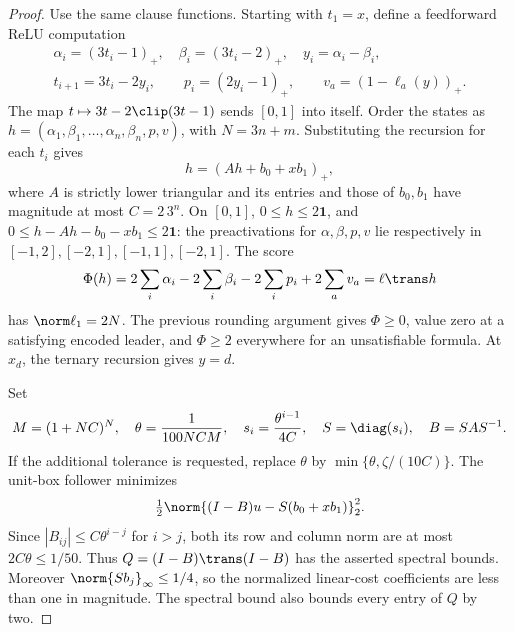 \begin{proof}
Use the same clause functions. Starting with \(t_1=x\), define a feedforward
ReLU computation
\[
 \begin{gathered}
 \alpha_i=(3t_i-1)_+,\quad \beta_i=(3t_i-2)_+,\quad y_i=\alpha_i-\beta_i,\\
 t_{i+1}=3t_i-2y_i,\qquad p_i=(2y_i-1)_+,\qquad v_a=(1-\ell_a(y))_+.
 \end{gathered}
\]
The map \(t\mapsto3t-2\clip(3t-1)\) sends \([0,1]\) into itself.
Order the states as \(h=(\alpha_1,\beta_1,\ldots,\alpha_n,\beta_n,p,v)\),
with \(N=3n+m\). Substituting the recursion for each \(t_i\) gives
\[
 h=(Ah+b_0+xb_1)_+,
\]
where \(A\) is strictly lower triangular and its entries and those of \(b_0,b_1\)
have magnitude at most \(C=2\,3^n\). On \([0,1]\),
\(0\le h\le2\mathbf1\), and
\(0\le h-Ah-b_0-xb_1\le2\mathbf1\): the preactivations for \(\alpha,\beta,p,v\)
lie respectively in \([-1,2],[-2,1],[-1,1],[-2,1]\).
The score
\[
 \Phi(h)=2\sum_i\alpha_i-2\sum_i\beta_i-2\sum_i p_i+2\sum_a v_a
          =\ell\trans h
\]
has \(\norm\ell_1=2N\). The previous rounding argument gives \(\Phi\ge0\),
value zero at a satisfying encoded leader, and \(\Phi\ge2\) everywhere for an
unsatisfiable formula. At \(x_d\), the ternary recursion gives \(y=d\).

Set
\[
 M=(1+NC)^N,\quad \theta=\frac1{100NCM},\quad
 s_i=\frac{\theta^{i-1}}{4C},\quad S=\diag(s_i),\quad B=SAS^{-1}.
\]
If the additional tolerance is requested, replace \(\theta\) by
\(\min\{\theta,\zeta/(10C)\}\). The unit-box follower minimizes
\begin{equation}\label{eq:scaled-network-energy}
 \tfrac12\norm{(I-B)u-S(b_0+xb_1)}_2^2.
\end{equation}
Since \(|B_{ij}|\le C\theta^{i-j}\) for \(i>j\), both its row and column norm
are at most \(2C\theta\le1/50\). Thus \(Q=(I-B)\trans(I-B)\) has the asserted
spectral bounds. Moreover \(\norm{Sb_j}_\infty\le1/4\), so the normalized
linear-cost coefficients are less than one in magnitude. The spectral bound
also bounds every entry of \(Q\) by two.


\end{proof}
